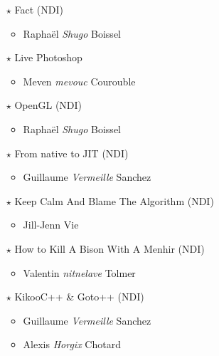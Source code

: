 \documentclass[a4paper]{article}
\begin{document}
\begin{itemize}
        \vspace{0.3cm}

    \item[$\star$] Fact (NDI)
        \begin{itemize}
            \item Raphaël \emph{Shugo} Boissel
        \end{itemize}

        \vspace{0.3cm}

    \item[$\star$] Live Photoshop
        \begin{itemize}
            \item Meven \emph{mevouc} Courouble
        \end{itemize}

        \vspace{0.3cm}

    \item[$\star$] OpenGL (NDI)
        \begin{itemize}
            \item Raphaël \emph{Shugo} Boissel
        \end{itemize}

        \vspace{0.3cm}

    \item[$\star$] From native to JIT (NDI)
        \begin{itemize}
            \item Guillaume \emph{Vermeille} Sanchez
        \end{itemize}

        \vspace{0.3cm}

    \item[$\star$] Keep Calm And Blame The Algorithm (NDI)
        \begin{itemize}
            \item Jill-Jenn Vie
        \end{itemize}

        \vspace{0.3cm}

    \item[$\star$] How to Kill A Bison With A Menhir (NDI)
        \begin{itemize}
            \item Valentin \emph{nitnelave} Tolmer
        \end{itemize}

        \vspace{0.3cm}

    \item[$\star$] KikooC++ \& Goto++ (NDI)
        \begin{itemize}
            \item Guillaume \emph{Vermeille} Sanchez
            \item Alexis \emph{Horgix} Chotard
        \end{itemize}

        \vspace{0.3cm}
\end{itemize}
\end{document}
